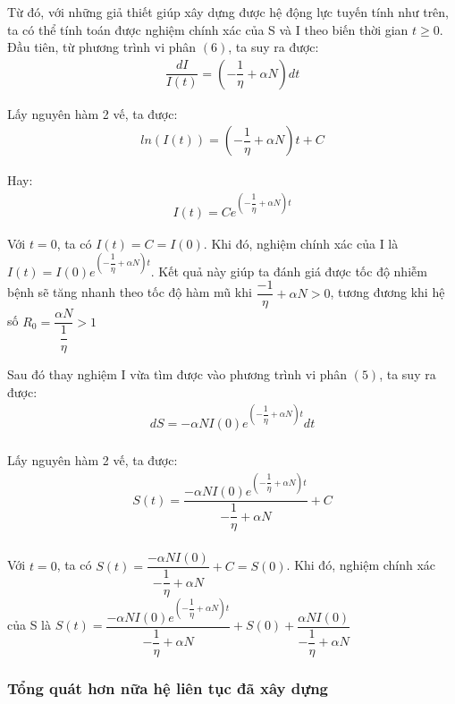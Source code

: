 \documentclass[a4paper]{article}
\begin{document}
\begin{itemize}
    Từ đó, với những giả thiết giúp xây dựng được hệ động lực tuyến tính như trên, ta có thể tính toán được nghiệm chính xác của S và I theo biến thời gian $t \geq 0$. Đầu tiên, từ phương trình vi phân $(6)$, ta suy ra được:
    \begin{align*}
            \dfrac{dI}{I(t)} = (- \dfrac{1}{\eta} +  \alpha N)dt
    \end{align*}
    
    Lấy nguyên hàm 2 vế, ta được:
    \begin{align*}
            ln(I(t)) = (- \dfrac{1}{\eta} +  \alpha N)t + C
    \end{align*}
    
    Hay:
    \begin{align*}
            I(t) = Ce^{(- \dfrac{1}{\eta} +  \alpha N)t}
    \end{align*}
    
    Với $t = 0$, ta có $I(t) = C = I(0)$. Khi đó, nghiệm chính xác của I là $ I(t) = I(0)e^{(- \dfrac{1}{\eta} +  \alpha N)t}$. Kết quả này giúp ta đánh giá được tốc độ nhiễm bệnh sẽ tăng nhanh theo tốc độ hàm mũ khi $\dfrac{-1}{\eta} + \alpha N > 0$, tương đương khi hệ số $R_0 = \dfrac{\alpha N}{\dfrac{1}{\eta}} > 1$
    
    Sau đó thay nghiệm I vừa tìm được vào phương trình vi phân $(5)$, ta suy ra được:
    \begin{align*}
            dS = -\alpha NI(0)e^{(- \dfrac{1}{\eta} +  \alpha N)t}dt \\
    \end{align*}
    
    Lấy nguyên hàm 2 vế, ta được:
    \begin{align*}
            S(t) = \dfrac{-\alpha NI(0)e^{(- \dfrac{1}{\eta} +  \alpha N)t}}{- \dfrac{1}{\eta} +  \alpha N} + C \\
    \end{align*}
    
    Với $t = 0$, ta có $S(t) = \dfrac{-\alpha NI(0)}{- \dfrac{1}{\eta} +  \alpha N} + C = S(0)$. Khi đó, nghiệm chính xác của S là $S(t) = \dfrac{-\alpha NI(0)e^{(- \dfrac{1}{\eta} +  \alpha N)t}}{- \dfrac{1}{\eta} +  \alpha N} + S(0) + \dfrac{\alpha NI(0)}{- \dfrac{1}{\eta} +  \alpha N}$
\end{itemize}

\subsubsection{Tổng quát hơn nữa hệ liên tục đã xây dựng}
\end{document}

